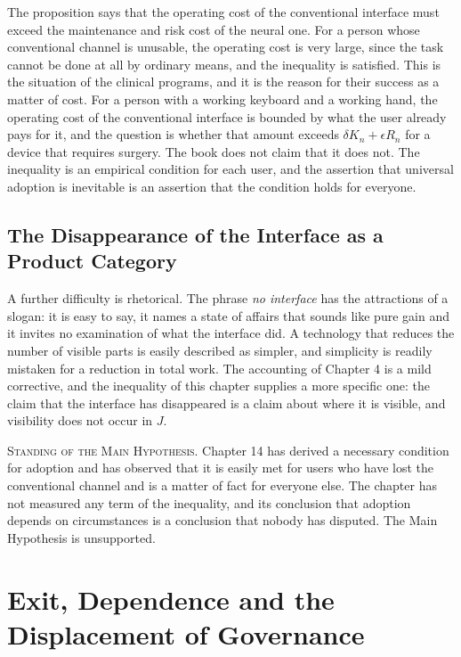 \documentclass[11pt,twoside,openany]{book}
\theoremstyle{definition}
\theoremstyle{remark}
\newenvironment{standing}{\par\medskip\noindent\hrulefill\par\smallskip\noindent\textsc{Standing of the Main Hypothesis.}\enspace}{\par\smallskip\noindent\hrulefill\par\medskip}
\begin{document}
The proposition says that the operating cost of the conventional interface must exceed the maintenance and risk cost of the neural one. For a person whose conventional channel is unusable, the operating cost is very large, since the task cannot be done at all by ordinary means, and the inequality is satisfied. This is the situation of the clinical programs, and it is the reason for their success as a matter of cost. For a person with a working keyboard and a working hand, the operating cost of the conventional interface is bounded by what the user already pays for it, and the question is whether that amount exceeds $\delta K_n+\epsilon R_n$ for a device that requires surgery. The book does not claim that it does not. The inequality is an empirical condition for each user, and the assertion that universal adoption is inevitable is an assertion that the condition holds for everyone.

\section{The Disappearance of the Interface as a Product Category}

A further difficulty is rhetorical. The phrase \emph{no interface} has the attractions of a slogan: it is easy to say, it names a state of affairs that sounds like pure gain and it invites no examination of what the interface did. A technology that reduces the number of visible parts is easily described as simpler, and simplicity is readily mistaken for a reduction in total work. The accounting of Chapter 4 is a mild corrective, and the inequality of this chapter supplies a more specific one: the claim that the interface has disappeared is a claim about where it is visible, and visibility does not occur in $J$.

\begin{standing}
Chapter 14 has derived a necessary condition for adoption and has observed that it is easily met for users who have lost the conventional channel and is a matter of fact for everyone else. The chapter has not measured any term of the inequality, and its conclusion that adoption depends on circumstances is a conclusion that nobody has disputed. The Main Hypothesis is unsupported.
\end{standing}

\chapter{Exit, Dependence and the Displacement of Governance}
\end{document}
